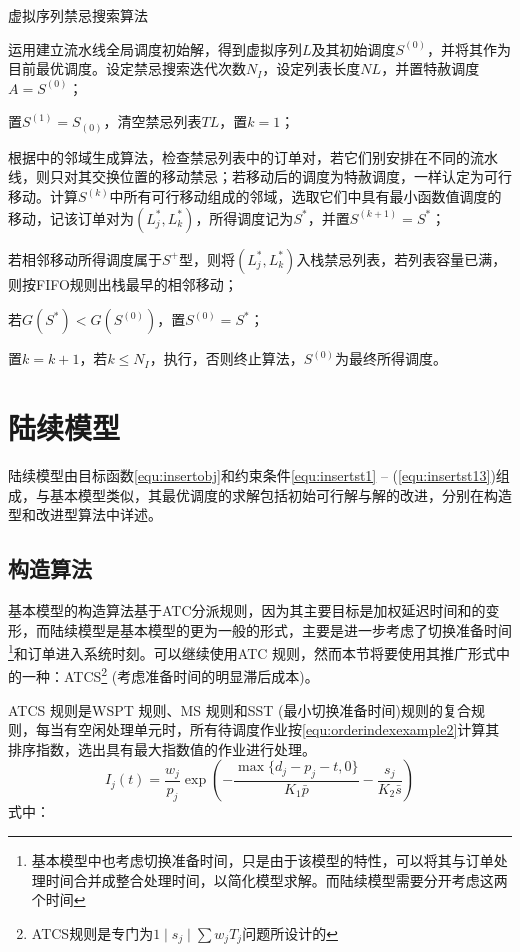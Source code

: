 \begin{algori}
虚拟序列禁忌搜索算法
\begin{asparaenum}
\renewcommand{\labelenumi}{\bf Step\theenumi~}
\item 运用建立流水线全局调度初始解，得到虚拟序列$L$及其初始调度$S^{(0)}$，并将其作为目前最优调度。设定禁忌搜索迭代次数$N_I$，设定列表长度$NL$，并置特赦调度$A = S^{(0)}$；
\item 置$S^{(1)} = S_{(0)}$，清空禁忌列表$TL$，置$k = 1$；
\item 根据中的邻域生成算法，检查禁忌列表中的订单对，若它们别安排在不同的流水线，则只对其交换位置的移动禁忌；若移动后的调度为特赦调度，一样认定为可行移动。计算$S^{(k)}$中所有可行移动组成的邻域，选取它们中具有最小函数值调度的移动，记该订单对为$(L_j^*, L_k^*)$，所得调度记为$S^*$，并置$S^{(k+1)} = S^*$；
\item 若相邻移动所得调度属于$S^+$型，则将$(L_j^*, L_k^*)$入栈禁忌列表，若列表容量已满，则按FIFO规则出栈最早的相邻移动；
\item 若$G(S^*) < G(S^{(0)})$，置$S^{(0)} = S^*$；
\item 置$k = k + 1$，若$k\le N_I$，执行，否则终止算法，$S^{(0)}$为最终所得调度。
\end{asparaenum}
\end{algori}

\section{陆续模型}
陆续模型由目标函数\eqref{equ:insertobj}和约束条件\eqref{equ:insertst1} -- (\ref{equ:insertst13})组成，与基本模型类似，其最优调度的求解包括初始可行解与解的改进，分别在构造型和改进型算法中详述。
\subsection{构造算法}
基本模型的构造算法基于ATC分派规则，因为其主要目标是加权延迟时间和的变形，而陆续模型是基本模型的更为一般的形式，主要是进一步考虑了切换准备时间\footnote{基本模型中也考虑切换准备时间，只是由于该模型的特性，可以将其与订单处理时间合并成整合处理时间，以简化模型求解。而陆续模型需要分开考虑这两个时间}和订单进入系统时刻。可以继续使用ATC 规则，然而本节将要使用其推广形式中的一种：ATCS\footnote{ATCS规则是专门为$1\mid s_j\mid\sum w_jT_j$问题所设计的} (考虑准备时间的明显滞后成本)。

ATCS 规则是WSPT 规则、MS 规则和SST (最小切换准备时间)规则的复合规则，每当有空闲处理单元时，所有待调度作业按\eqref{equ:orderindexexample2}计算其排序指数，选出具有最大指数值的作业进行处理。
\begin{equation}
I_j(t) = \frac{w_j}{p_j}\exp\left(-\frac{\max\{d_j - p_j - t, 0\}}{K_1\bar p} - \frac{s_j}{K_2 \bar s}\right) \label{equ:orderindexexample2}
\end{equation}
式中：

